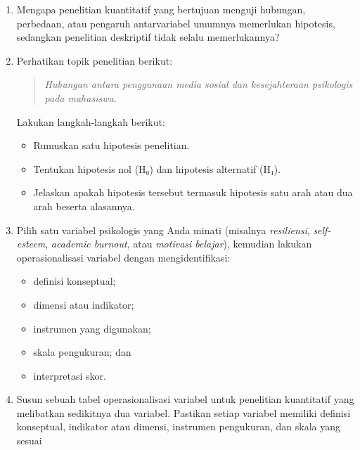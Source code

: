 \documentclass[
  indonesian,
  letterpaper,
  DIV=11,
  numbers=noendperiod]{scrreprt}
\providecommand{\tightlist}{%
  \setlength{\itemsep}{0pt}\setlength{\parskip}{0pt}}
\begin{document}
\begin{tcolorbox}[enhanced jigsaw, colframe=quarto-callout-important-color-frame, toptitle=1mm, breakable, leftrule=.75mm, arc=.35mm, toprule=.15mm, colback=white, colbacktitle=quarto-callout-important-color!10!white, bottomtitle=1mm, bottomrule=.15mm, titlerule=0mm, title=\textcolor{quarto-callout-important-color}{\faExclamation}\hspace{0.5em}{Refleksi \& Diskusi}, coltitle=black, left=2mm, opacitybacktitle=0.6, opacityback=0, rightrule=.15mm]

\begin{enumerate}
\def\labelenumi{\arabic{enumi}.}
\item
  Mengapa penelitian kuantitatif yang bertujuan menguji hubungan,
  perbedaan, atau pengaruh antarvariabel umumnya memerlukan hipotesis,
  sedangkan penelitian deskriptif tidak selalu memerlukannya?
\item
  Perhatikan topik penelitian berikut:

  \begin{quote}
  \emph{Hubungan antara penggunaan media sosial dan kesejahteraan
  psikologis pada mahasiswa.}
  \end{quote}

  Lakukan langkah-langkah berikut:

  \begin{itemize}
  \tightlist
  \item
    Rumuskan satu hipotesis penelitian.
  \item
    Tentukan hipotesis nol (H₀) dan hipotesis alternatif (H₁).
  \item
    Jelaskan apakah hipotesis tersebut termasuk hipotesis satu arah atau
    dua arah beserta alasannya.
  \end{itemize}
\item
  Pilih satu variabel psikologis yang Anda minati (misalnya
  \emph{resiliensi}, \emph{self-esteem}, \emph{academic burnout}, atau
  \emph{motivasi belajar}), kemudian lakukan operasionalisasi variabel
  dengan mengidentifikasi:

  \begin{itemize}
  \tightlist
  \item
    definisi konseptual;
  \item
    dimensi atau indikator;
  \item
    instrumen yang digunakan;
  \item
    skala pengukuran; dan
  \item
    interpretasi skor.
  \end{itemize}
\item
  Susun sebuah tabel operasionalisasi variabel untuk penelitian
  kuantitatif yang melibatkan sedikitnya dua variabel. Pastikan setiap
  variabel memiliki definisi konseptual, indikator atau dimensi,
  instrumen pengukuran, dan skala yang sesuai
\end{enumerate}

\end{tcolorbox}
\end{document}
